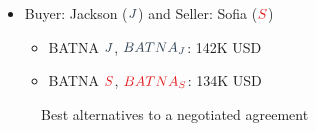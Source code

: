 \documentclass[
  ignorenonframetext,
]{beamer}
\providecommand{\tightlist}{%
  \setlength{\itemsep}{0pt}\setlength{\parskip}{0pt}}\usepackage{longtable,booktabs,array}
\begin{document}
\begin{frame}{}
\label{section-5}

\begin{itemize}
\item
  Buyer: Jackson (\(\color{blue}{J}\)) and Seller: Sofia
  (\(\color{red}{S}\))

  \begin{itemize}
  \tightlist
  \item
    BATNA \(\color{blue}{J}\), \(\color{blue}{BATNA_J}\): 142K USD
  \item
    BATNA \(\color{red}{S}\), \(\color{red}{BATNA_S}\): 134K USD
  \end{itemize}
\end{itemize}

\begin{figure}


\caption{\label{fig-batna}Best alternatives to a negotiated agreement}

\end{figure}%
\end{frame}
\end{document}
